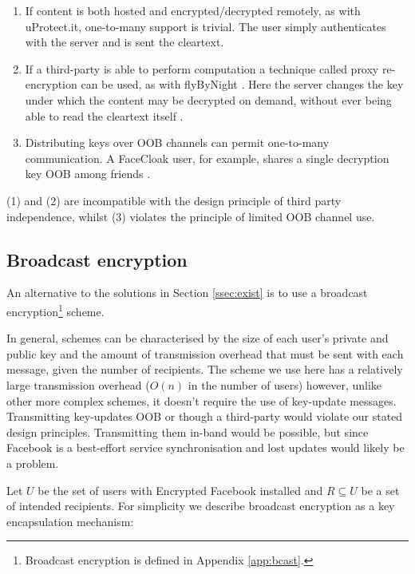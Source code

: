 \begin{enumerate}

    \item If content is both hosted and encrypted/decrypted remotely, as with uProtect.it, one-to-many support is trivial. The user simply authenticates with the server and is sent the cleartext.
    
    \item If a third-party is able to perform computation a technique called proxy re-encryption can be used, as with flyByNight \cite{flybynight}. Here the server changes the key under which the content may be decrypted on demand, without ever being able to read the cleartext itself \cite{proxy}.
    
    \item Distributing keys over OOB channels can permit one-to-many communication. A FaceCloak user, for example, shares a single decryption key OOB among friends \cite{facecloak}.

\end{enumerate}

(1) and (2) are incompatible with the design principle of third party independence, whilst (3) violates the principle of limited OOB channel use.

\FloatBarrier
\subsection{Broadcast encryption}

An alternative to the solutions in Section \ref{ssec:exist} is to use a broadcast encryption\footnote{Broadcast encryption is defined in Appendix \ref{app:bcast}.} scheme. 

In general, schemes can be characterised by the size of each user's private and public key and the amount of transmission overhead that must be sent with each message, given the number of recipients. The scheme we use here has a relatively large transmission overhead ($O(n)$ in the number of users) however, unlike other more complex schemes, it doesn't require the use of key-update messages. Transmitting key-updates OOB or though a third-party would violate our stated design principles. Transmitting them in-band would be possible, but since Facebook is a best-effort service synchronisation and lost updates would likely be a problem.

Let $U$ be the set of users with Encrypted Facebook installed and $R \subseteq U$ be a set of intended recipients. For simplicity we describe broadcast encryption as a key encapsulation mechanism:


